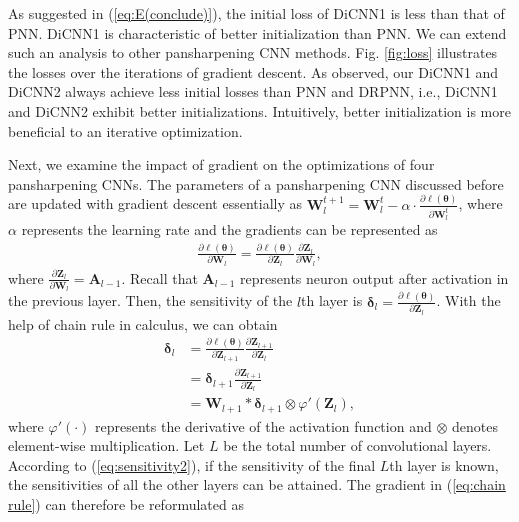 \documentclass[journal]{IEEEtran}
\begin{document}
As suggested in (\ref{eq:E(conclude)}), the initial loss of DiCNN1 is less than that of PNN. DiCNN1 is characteristic of better initialization than PNN. We can extend such an analysis to other pansharpening CNN methods. Fig. \ref{fig:loss} illustrates the losses over the iterations of gradient descent. As observed, our DiCNN1 and DiCNN2 always achieve less initial losses than PNN and DRPNN, i.e., DiCNN1 and DiCNN2 exhibit better initializations. Intuitively, better initialization is more beneficial to an iterative optimization.

Next, we examine the impact of gradient on the optimizations of four pansharpening CNNs. The parameters of a pansharpening CNN discussed before are updated with gradient descent essentially as
$\mathbf{W}^{t+1}_l=\mathbf{W}^{t}_l - \alpha \cdot \frac{\partial \ell(\pmb{\theta})}{\partial \mathbf{W}^{t}_l}$,
where $\alpha$ represents the learning rate
and the gradients can be represented as
\begin{equation}
\label{eq:chain rule}
\begin{split}
\frac{\partial \ell(\pmb{\theta})}{\partial \mathbf{W}_l} = \frac{\partial \ell(\pmb{\theta})}{\partial \mathbf{Z}_l} \frac{\partial \mathbf{Z}_l}{\partial \mathbf{W}_l},
\end{split}
\end{equation}
 where $\frac{\partial \mathbf{Z}_l}{\partial \mathbf{W}_l}=\mathbf{A}_{l-1}$. Recall that $\mathbf{A}_{l-1}$ represents neuron output after activation in the previous layer. Then, the sensitivity of the $l$th layer is $\pmb{\delta}_l = \frac{\partial \ell(\pmb{\theta})}{\partial \mathbf{Z}_l}$.
With the help of chain rule in calculus, we can obtain
\begin{equation}
\label{eq:sensitivity2}
    \begin{split}
\pmb{\delta}_l
    &= \frac{\partial \ell(\pmb{\theta})}{\partial \mathbf{Z}_{l+1}} \frac{\partial \mathbf{Z}_{l+1}}{\partial \mathbf{Z}_l}\\
    &= \pmb{\delta}_{l+1} \frac{\partial \mathbf{Z}_{l+1}}{\partial \mathbf{Z}_l}\\
&=\mathbf{W}_{l+1} * \pmb{\delta}_{l+1}  \otimes \varphi'(\mathbf{Z}_l),
    \end{split}
\end{equation}
where $\varphi'(\cdot)$ represents the derivative of the activation function and $\otimes$ denotes element-wise multiplication. Let $L$ be the total number of convolutional layers.
According to (\ref{eq:sensitivity2}),  if the sensitivity of the final  $L$th layer is known, the sensitivities of all the other layers can be attained. The gradient in  (\ref{eq:chain rule}) can therefore be reformulated as
\end{document}
